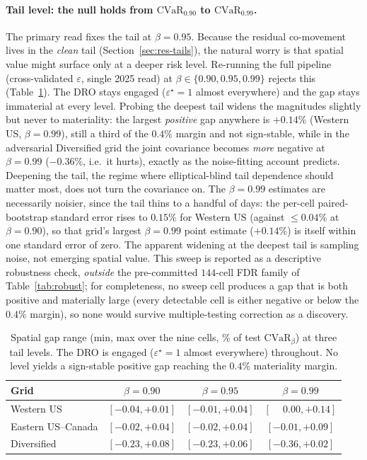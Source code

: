 \documentclass[12pt]{article}
\newcommand{\CVaR}{\mathrm{CVaR}}
\begin{document}
\paragraph{Tail level: the null holds from $\CVaR_{0.90}$ to $\CVaR_{0.99}$.}
The primary read fixes the tail at $\beta=0.95$. Because the residual co-movement
lives in the \emph{clean} tail (Section~\ref{sec:res-tails}), the natural worry is
that spatial value might surface only at a deeper risk level. Re-running the full
pipeline (cross-validated $\varepsilon$, single 2025 read) at
$\beta\in\{0.90,0.95,0.99\}$ rejects this (Table~\ref{tab:cvarsweep}). The DRO stays
engaged ($\varepsilon^\star=1$ almost everywhere) and the gap stays immaterial at
every level. Probing the deepest tail widens the magnitudes slightly but never to
materiality: the largest \emph{positive} gap anywhere is $+0.14\%$ (Western US,
$\beta=0.99$), still a third of the $0.4\%$ margin and not sign-stable, while in the
adversarial Diversified grid the joint covariance becomes \emph{more} negative at
$\beta=0.99$ ($-0.36\%$, i.e.\ it hurts), exactly as the noise-fitting account
predicts. Deepening the tail, the regime where elliptical-blind tail dependence
should matter most, does not turn the covariance on.
The $\beta=0.99$ estimates are necessarily noisier, since the tail thins to a handful
of days: the per-cell paired-bootstrap standard error rises to $0.15\%$ for Western
US (against $\le0.04\%$ at $\beta=0.90$), so that grid's largest $\beta=0.99$ point
estimate ($+0.14\%$) is itself within one standard error of zero. The apparent
widening at the deepest tail is sampling noise, not emerging spatial value. This
sweep is reported as a descriptive robustness check, \emph{outside} the
pre-committed $144$-cell FDR family of Table~\ref{tab:robust}; for completeness, no
sweep cell produces a gap that is both positive and materially large (every
detectable cell is either negative or below the $0.4\%$ margin), so none would
survive multiple-testing correction as a discovery.

\begin{table}[h]
\centering\small
\caption{Spatial gap range (min, max over the nine cells, \% of test
$\CVaR_\beta$) at three tail levels. The DRO is engaged ($\varepsilon^\star=1$
almost everywhere) throughout. No level yields a sign-stable positive gap reaching
the $0.4\%$ materiality margin.}
\label{tab:cvarsweep}
\begin{tabular}{lccc}
\toprule
Grid & $\beta=0.90$ & $\beta=0.95$ & $\beta=0.99$\\
\midrule
Western US         & $[-0.04,+0.01]$ & $[-0.01,+0.04]$ & $[\phantom{-}0.00,+0.14]$\\
Eastern US--Canada & $[-0.02,+0.04]$ & $[-0.02,+0.04]$ & $[-0.01,+0.09]$\\
Diversified        & $[-0.23,+0.08]$ & $[-0.23,+0.06]$ & $[-0.36,+0.02]$\\
\bottomrule
\end{tabular}
\end{table}
\end{document}
